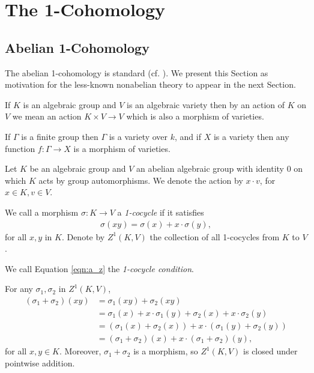 
\chapter{The 1-Cohomology}
\label{Chapter3}

\section{Abelian 1-Cohomology}
The abelian 1-cohomology is standard (cf. \cite{brown1976cohomology}). We present this Section as motivation for the less-known nonabelian theory to appear in the next Section.

If $K$ is an algebraic group and $V$ is an algebraic variety then by an action of $K$ on $V$ we mean an action $K\times V\rightarrow V$ which is also a morphism of varieties.

If $\Gamma$ is a finite group then $\Gamma$ is a variety over $k$, and if $X$ is a variety then any function $f:\Gamma \rightarrow X$ is a morphism of varieties.

Let $K$ be an algebraic group and $V$ an abelian algebraic group with identity $0$ on which $K$ acts by group automorphisms. We denote the action by $x \cdot v$, for $x \in K, v \in V$.

\begin{definition} We call a morphism $\sigma: K\rightarrow V$ a \emph{1-cocycle} if it satisfies
	\begin{align}
		\sigma(xy) = \sigma(x) + x\cdot\sigma(y),
		\label{eqn:a_z}
	\end{align}
	for all $x, y$ in $K$. Denote by $Z^1\left( K, V \right)$ the collection of all 1-cocycles from $K$ to $V$.

	We call Equation \ref{eqn:a_z} the \emph{1-cocycle condition}.
\end{definition}

For any $\sigma_1, \sigma_2$ in $Z^1\left(K, V\right)$,
\begin{align*}
	\left(\sigma_1 + \sigma_2\right)(xy) &=  \sigma_1(xy) +  \sigma_2(xy) \\
	&=  \sigma_1(x) + x\cdot\sigma_1(y) +  \sigma_2(x) + x\cdot\sigma_2(y)\\
	&=  \left( \sigma_1(x) + \sigma_2(x) \right) + x\cdot\left(\sigma_1(y) + \sigma_2(y)\right) \\
	&=  \left(\sigma_1+\sigma_2\right)(x) + x\cdot\left(\sigma_1 + \sigma_2\right)(y),
\end{align*}
for all $x,y \in K$. Moreover, $\sigma_1 + \sigma_2$ is a morphism, so $Z^1(K, V)$ is closed under pointwise addition.

